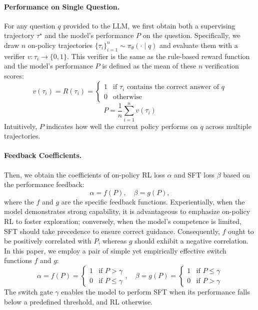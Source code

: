 \documentclass{article} %
\newcommand{\0}{\mathbb{0}}
\newcommand{\1}{\mathbb{1}}
\begin{document}
\paragraph{Performance on Single Question.} 
For any question $q$ provided to the LLM, we first obtain both a supervising trajectory $\tau^\star$ and the model's performance $P$ on the question.
Specifically, we draw $n$ on-policy trajectories $\{\tau_i\}^n_{i=1} \sim \pi_{\theta}(\cdot\mid q)$ and evaluate them with a verifier $v:\tau_i\to\{0,1\}$. This verifier is the same as the rule-based reward function and the model's performance $P$ is defined as the mean of these $n$ verification scores:
\begin{equation}
\label{eq: compute r}
v(\tau_i) = R(\tau_i) =\begin{cases}
 1 & \text{if } \tau_i \text{ contains the correct answer of } q  \\
 0 & \text{otherwise}
\end{cases} 
\end{equation}
\begin{equation}
P = \frac{1}{n}\sum_{i=1}^n v(\tau_i)
\end{equation}
Intuitively, $P$ indicates how well the current policy performs on $q$ across multiple trajectories.

\paragraph{Feedback Coefficients.} Then, we obtain the coefficients of on-policy RL loss $\alpha$ and SFT loss $\beta$ based on the performance feedback:
\begin{equation}
\alpha = f(P), \quad \beta = g(P),
\end{equation}
where the $f$ and $g$ are the specific feedback functions.
Experientially, when the model demonstrates strong capability, it is advantageous to emphasize on-policy RL to foster exploration; conversely, when the model’s competence is limited, SFT should take precedence to ensure correct guidance. Consequently, $f$ ought to be positively correlated with $P$, whereas $g$ should exhibit a negative correlation. In this paper, we employ a pair of simple yet empirically effective switch functions $f$ and $g$:
\begin{equation}
\alpha = f(P) =\begin{cases}
 1 & \text{if } P>\gamma   \\
 0 & \text{if } P\leq\gamma 
\end{cases} , \quad
\beta = g(P) =\begin{cases}
 1 & \text{if } P\leq\gamma    \\
 0 & \text{if } P>\gamma  
\end{cases}
\end{equation}
The switch gate $\gamma$ enables the model to perform SFT when its performance falls below a predefined threshold, and RL otherwise.
\end{document}
